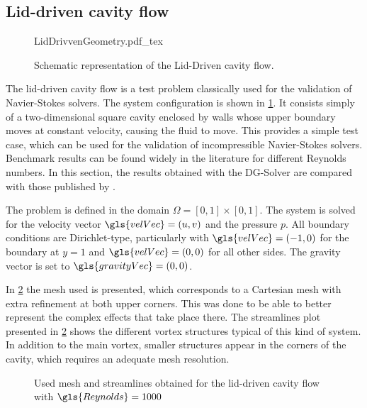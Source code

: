 \subsection{Lid-driven cavity flow}
\begin{figure}[b]
	\begin{center}
		\def\svgwidth{0.3\textwidth}
		{LidDrivvenGeometry.pdf_tex}
		\caption{Schematic representation of the Lid-Driven cavity flow.}
		\label{fig:LidDrivenCavity}
	\end{center}
\end{figure}

The lid-driven cavity flow is a test problem classically used for the validation of Navier-Stokes solvers. The system configuration is shown in \cref{fig:LidDrivenCavity}. It consists simply of a two-dimensional square cavity enclosed by walls whose upper boundary moves at constant velocity, causing the fluid to move. This provides a simple test case, which can be used for the validation of incompressible Navier-Stokes solvers. Benchmark results can be found widely in the literature for different Reynolds numbers. In this section, the results obtained with the DG-Solver are compared with those published by \cite{botellaBenchmarkSpectralResults1998}. 

The problem is defined in the domain $\Omega = [0,1]\times [0,1]$. The system is solved for the velocity vector $\gls{velVec} = (u,v)$ and the pressure $p$. All boundary conditions are Dirichlet-type, particularly with $\gls{velVec} = (-1,0)$ for the boundary at $y = 1$ and $\gls{velVec} = (0,0)$ for all other sides. The gravity vector is set to $\gls{gravityVec} = (0,0)$.

In \cref{fig:LiddrivenMesh} the mesh used is presented, which corresponds to a Cartesian mesh with extra refinement at both upper corners. This was done to be able to better represent the complex effects that take place there.  The streamlines plot presented in \cref{fig:LiddrivenMesh} shows the different vortex structures typical of this kind of system. In addition to the main vortex, smaller structures appear in the corners of the cavity, which requires an adequate mesh resolution.

\begin{figure}[t]
	\centering
	\pgfplotsset{width=0.35 \textwidth, compat=1.3}
	\caption{Used mesh and streamlines obtained for the lid-driven cavity flow with $\gls{Reynolds} = 1000$} \label{fig:LiddrivenMesh}
\end{figure}

